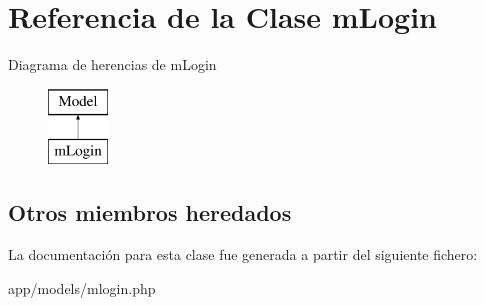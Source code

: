 \hypertarget{classm_login}{}\section{Referencia de la Clase m\+Login}
\label{classm_login}
Diagrama de herencias de m\+Login\begin{figure}[H]
\begin{center}
\leavevmode
\includegraphics[height=2.000000cm]{classm_login}
\end{center}
\end{figure}
\subsection*{Otros miembros heredados}


La documentación para esta clase fue generada a partir del siguiente fichero\+:\begin{DoxyCompactItemize}
\item 
app/models/mlogin.\+php\end{DoxyCompactItemize}
